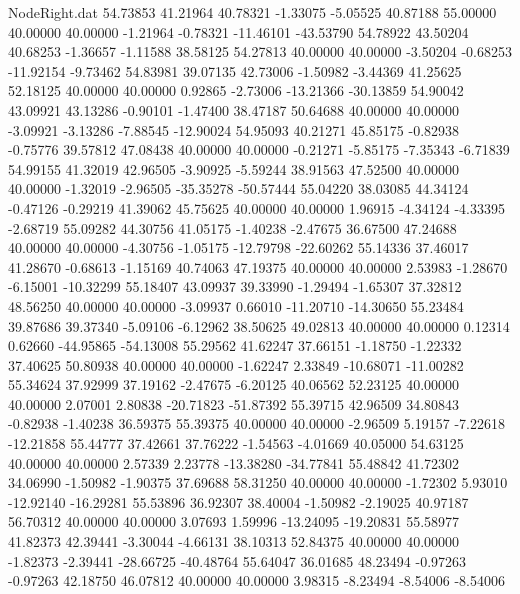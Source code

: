 \begin{filecontents}{NodeRight.dat}
  54.73853   41.21964   40.78321    -1.33075   -5.05525   40.87188   55.00000   40.00000   40.00000   -1.21964   -0.78321  -11.46101  -43.53790
  54.78922   43.50204   40.68253    -1.36657   -1.11588   38.58125   54.27813   40.00000   40.00000   -3.50204   -0.68253  -11.92154   -9.73462
  54.83981   39.07135   42.73006    -1.50982   -3.44369   41.25625   52.18125   40.00000   40.00000    0.92865   -2.73006  -13.21366  -30.13859
  54.90042   43.09921   43.13286    -0.90101   -1.47400   38.47187   50.64688   40.00000   40.00000   -3.09921   -3.13286   -7.88545  -12.90024
  54.95093   40.21271   45.85175    -0.82938   -0.75776   39.57812   47.08438   40.00000   40.00000   -0.21271   -5.85175   -7.35343   -6.71839
  54.99155   41.32019   42.96505    -3.90925   -5.59244   38.91563   47.52500   40.00000   40.00000   -1.32019   -2.96505  -35.35278  -50.57444
  55.04220   38.03085   44.34124    -0.47126   -0.29219   41.39062   45.75625   40.00000   40.00000    1.96915   -4.34124   -4.33395   -2.68719
  55.09282   44.30756   41.05175    -1.40238   -2.47675   36.67500   47.24688   40.00000   40.00000   -4.30756   -1.05175  -12.79798  -22.60262
  55.14336   37.46017   41.28670    -0.68613   -1.15169   40.74063   47.19375   40.00000   40.00000    2.53983   -1.28670   -6.15001  -10.32299
  55.18407   43.09937   39.33990    -1.29494   -1.65307   37.32812   48.56250   40.00000   40.00000   -3.09937    0.66010  -11.20710  -14.30650
  55.23484   39.87686   39.37340    -5.09106   -6.12962   38.50625   49.02813   40.00000   40.00000    0.12314    0.62660  -44.95865  -54.13008
  55.29562   41.62247   37.66151    -1.18750   -1.22332   37.40625   50.80938   40.00000   40.00000   -1.62247    2.33849  -10.68071  -11.00282
  55.34624   37.92999   37.19162    -2.47675   -6.20125   40.06562   52.23125   40.00000   40.00000    2.07001    2.80838  -20.71823  -51.87392
  55.39715   42.96509   34.80843    -0.82938   -1.40238   36.59375   55.39375   40.00000   40.00000   -2.96509    5.19157   -7.22618  -12.21858
  55.44777   37.42661   37.76222    -1.54563   -4.01669   40.05000   54.63125   40.00000   40.00000    2.57339    2.23778  -13.38280  -34.77841
  55.48842   41.72302   34.06990    -1.50982   -1.90375   37.69688   58.31250   40.00000   40.00000   -1.72302    5.93010  -12.92140  -16.29281
  55.53896   36.92307   38.40004    -1.50982   -2.19025   40.97187   56.70312   40.00000   40.00000    3.07693    1.59996  -13.24095  -19.20831
  55.58977   41.82373   42.39441    -3.30044   -4.66131   38.10313   52.84375   40.00000   40.00000   -1.82373   -2.39441  -28.66725  -40.48764
  55.64047   36.01685   48.23494    -0.97263   -0.97263   42.18750   46.07812   40.00000   40.00000    3.98315   -8.23494   -8.54006   -8.54006

\end{filecontents}

